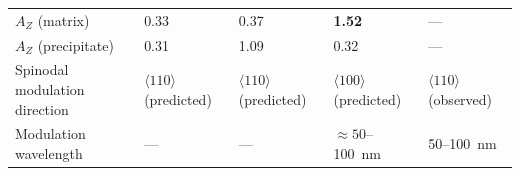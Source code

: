 \begin{table}[!h]
\begin{tabularx}{\textwidth}{lXXXX}
        $A_Z$ (matrix)
            & 0.33
            & 0.37
            & \textbf{1.52}
            & --- \\
        $A_Z$ (precipitate)
            & 0.31
            & 1.09
            & 0.32
            & --- \\
        Spinodal modulation direction
            & $\langle 110 \rangle$ (predicted)
            & $\langle 110 \rangle$ (predicted)
            & $\langle 100 \rangle$ (predicted)
            & $\langle 110 \rangle$ (observed) \\
        Modulation wavelength
            & ---
            & ---
            & ${\approx}50$--\SI{100}{\nano\metre}
            & 50--\SI{100}{\nano\metre} \\
        \bottomrule
    \end{tabularx}
\end{table}

